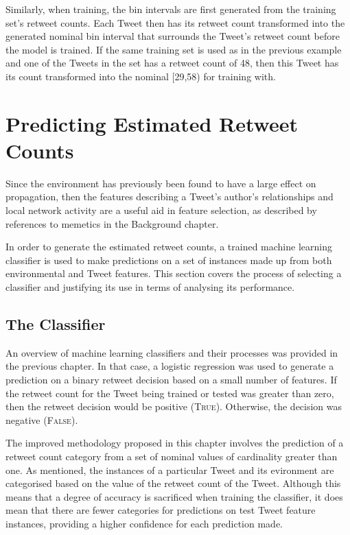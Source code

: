 Similarly, when training, the bin intervals are first generated from the training set's retweet counts. Each Tweet then has its retweet count transformed into the generated nominal bin interval that surrounds the Tweet's retweet count before the model is trained. If the same training set is used as in the previous example and one of the Tweets in the set has a retweet count of 48, then this Tweet has its count transformed into the nominal {[29,58)} for training with.
 

\section{Predicting Estimated Retweet Counts}
Since the environment has previously been found to have a large effect on propagation, then the features describing a Tweet's author's relationships and local network activity  are a useful aid in feature selection, as described by references to memetics in the Background chapter. 
 
In order to generate the estimated retweet counts, a trained machine learning classifier is used to make predictions on a set of instances made up from both environmental and Tweet features. This section covers the process of selecting a classifier and justifying its use in terms of analysing its performance.


\subsection{The Classifier}
An overview of machine learning classifiers and their processes was provided in the previous chapter. In that case, a logistic regression was used to generate a prediction on a binary retweet decision based on a small number of features. If the retweet count for the Tweet being trained or tested was greater than zero, then the retweet decision would be positive (\textsc{True}). Otherwise, the decision was negative (\textsc{False}).

The improved methodology proposed in this chapter involves the prediction of a retweet count category from a set of nominal values of cardinality greater than one. As mentioned, the instances of a particular Tweet and its evironment are categorised based on the value of the retweet count of the Tweet. Although this means that a degree of accuracy is sacrificed when training the classifier, it does mean that there are fewer categories for predictions on test Tweet feature instances, providing a higher confidence for each prediction made.

